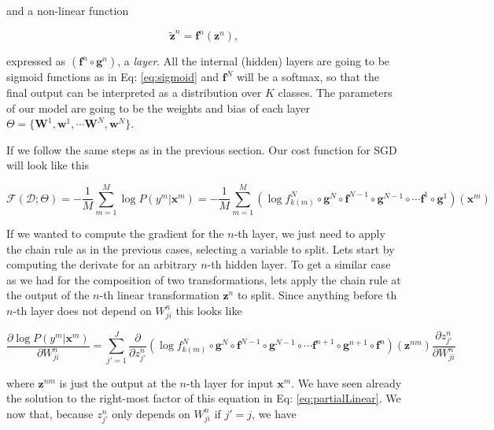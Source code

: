 \noindent and a non-linear function 

\begin{equation}
\tilde{\mathbf{z}}^n = \mathbf{f}^n(\mathbf{z}^n),
\end{equation}

expressed as $(\mathbf{f}^n \circ \mathbf{g}^n)$, a \textit{layer}. All the internal (hidden) layers are going to be sigmoid functions as in Eq: \ref{eq:sigmoid} and $\mathbf{f}^N$ will be a softmax, so that the final output can be interpreted as a distribution over $K$ classes. The parameters of our model are going to be the weights and bias of each layer $\Theta=\{\mathbf{W}^1, \mathbf{w}^1, \cdots \mathbf{W}^N, \mathbf{w}^N\}$.  

If we follow the same steps as in the previous section. Our cost function for SGD will look like this

\begin{equation}
\mathcal{F}(\mathcal{D};\Theta) = -\frac{1}{M}\sum_{m=1}^M \log P(y^m | \mathbf{x}^m) = -\frac{1}{M}\sum_{m=1}^M (\log f_{k(m)}^N \circ \mathbf{g}^N \circ \mathbf{f}^{N-1} \circ \mathbf{g}^{N-1} \circ \cdots \mathbf{f}^1 \circ \mathbf{g}^1)(\mathbf{x}^m)
\end{equation}

If we wanted to compute the gradient for the $n$-th layer, we just need to apply the chain rule as in the previous cases, selecting a variable to split. Lets start by computing the derivate for an arbitrary $n$-th hidden layer. To get a similar case as we had for the composition of two transformations, lets apply the chain rule at the output of the $n$-th linear transformation $\mathbf{z}^n$ to split. Since anything before th $n$-th layer does not depend on $W_{ji}^n$ this looks like  

\begin{equation}
\frac{\partial \log P(y^m | \mathbf{x}^m)}{\partial W_{ji}^n} = \sum_{j'=1}^J \frac{\partial}{\partial z^n_{j'}} (\log f_{k(m)}^N \circ \mathbf{g}^N \circ \mathbf{f}^{N-1} \circ \mathbf{g}^{N-1} \circ \cdots \mathbf{f}^{n+1} \circ \mathbf{g}^{n+1} \circ \mathbf{f}^{n})(\mathbf{z}^{nm})\frac{\partial z^n_{j'}}{\partial W_{ji}^n}
\label{eq:partialfn}
\end{equation}

where $\mathbf{z}^{nm}$ is just the output at the $n$-th layer for input $\mathbf{x}^{m}$. We have seen already the solution to the right-most factor of this equation in Eq: \ref{eq:partialLinear}. We now that, because $z^n_{j'}$ only depends on $W_{ji}^n$ if $j'=j$, we have 

